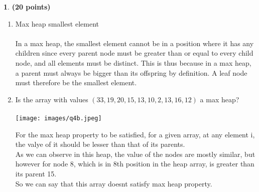 \documentclass[11pt]{article}
\theoremstyle{definition}
\newtheorem{prob}{}
\newcommand{\solution}{\medskip\noindent{\color{DarkBlue}\textbf{Solution:}}}
\begin{document}
\begin{prob} \textbf{(20 points)}
\end{prob}
\begin{enumerate}
    \item Max heap smallest element \\
    \solution \\
    In a max heap, the smallest element cannot be in a position where it has any children since every parent node must be greater than or equal to every child node, and all elements must be distinct. This is thus because in a max heap, a parent must always be bigger than its offspring by definition. A leaf node must therefore be the smallest element.

    \item Is the array with values $(33, 19, 20, 15, 13, 10, 2, 13, 16, 12)$ a max heap? \\
    \solution \\

    \texttt{[image: images/q4b.jpeg]}

    For the max heap property to be satisfied, for a given array, at any element i, the valye of it should be lesser than that of its parents. \\
    
    As we can observe in this heap, the value of the nodes are mostly similar, but however for node 8, which is in 8th position in the heap array, is greater than its parent 15. \\

    So we can say that this array doesnt satisfy max heap property.
\end{enumerate}




\end{document}
